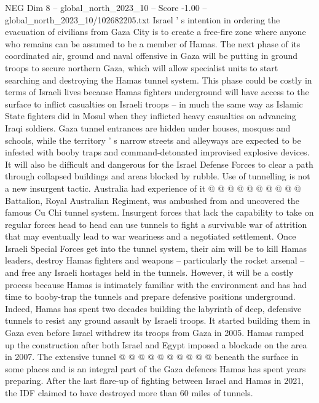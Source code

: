 \begin{textsample}{NEG Dim 8 – global\_north\_2023\_10 – Score -1.00 – global\_north\_2023\_10/102682205.txt}  \label{ex:f8_neg_213}
Israel ' s intention in ordering the evacuation of civilians from Gaza City is to create a free-fire zone where anyone who remains can be assumed to be a member of Hamas.
The next phase of its coordinated air, ground and naval offensive in Gaza will be putting in ground troops to secure northern Gaza, which will allow specialist units to start searching and destroying the Hamas tunnel system.
This phase could be costly in terms of Israeli lives because Hamas fighters underground will have access to the surface to inflict casualties on Israeli troops -- in much the same way as Islamic State fighters did in Mosul when they inflicted heavy casualties on advancing Iraqi soldiers.
Gaza tunnel entrances are hidden under houses, mosques and schools, while the territory ' s narrow streets and alleyways are expected to be infested with booby traps and command-detonated improvised explosive devices.
It will also be difficult and dangerous for the Israel Defense Forces to clear a path through collapsed buildings and areas blocked by rubble.
Use of tunnelling is not a new insurgent tactic.
Australia had experience of it @ @ @ @ @ @ @ @ @ @ Battalion, Royal Australian Regiment, was ambushed from and uncovered the famous Cu Chi tunnel system.
Insurgent forces that lack the capability to take on regular forces head to head can use tunnels to fight a survivable war of attrition that may eventually lead to war weariness and a negotiated settlement.
Once Israeli Special Forces get into the tunnel system, their aim will be to kill Hamas leaders, destroy Hamas fighters and weapons -- particularly the rocket arsenal -- and free any Israeli hostages held in the tunnels.
However, it will be a costly process because Hamas is intimately familiar with the environment and has had time to booby-trap the tunnels and prepare defensive positions underground.
Indeed, Hamas has spent two decades building the labyrinth of deep, defensive tunnels to resist any ground assault by Israeli troops.
It started building them in Gaza even before Israel withdrew its troops from Gaza in 2005.
Hamas ramped up the construction after both Israel and Egypt imposed a blockade on the area in 2007.
The extensive tunnel @ @ @ @ @ @ @ @ @ @ beneath the surface in some places and is an integral part of the Gaza defences Hamas has spent years preparing.
After the last flare-up of fighting between Israel and Hamas in 2021, the IDF claimed to have destroyed more than 60 miles of tunnels.

\end{textsample}
